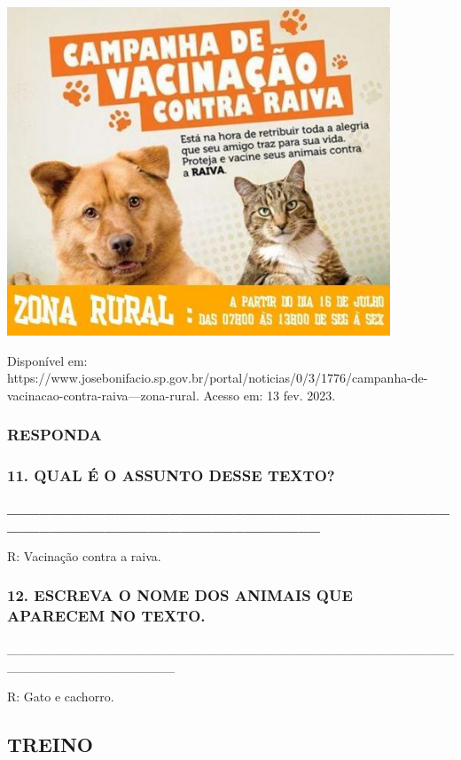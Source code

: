 \includegraphics[width=4.50249in,height=3.85413in]{media/image165.jpg}

Disponível em: https://www.josebonifacio.sp.gov.br/portal/noticias/0/3/1776/campanha-de-vacinacao-contra-raiva---zona-rural.
Acesso em: 13 fev. 2023.

\subsubsection{RESPONDA}\label{responda}

\subsubsection{11. QUAL É O ASSUNTO DESSE
TEXTO?}\label{qual-uxe9-o-assunto-desse-texto-1}

\textbf{\_\_\_\_\_\_\_\_\_\_\_\_\_\_\_\_\_\_\_\_\_\_\_\_\_\_\_\_\_\_\_\_\_\_\_\_\_\_\_\_\_\_\_\_\_\_\_\_\_\_\_\_\_\_\_\_\_\_\_\_\_\_\_\_\_\_\_\_\_\_}

R: Vacinação contra a raiva.

\subsubsection{12. ESCREVA O NOME DOS ANIMAIS QUE APARECEM NO
TEXTO.}\label{escreva-o-nome-dos-animais-que-aparece-no-texto.}

\_\_\_\_\_\_\_\_\_\_\_\_\_\_\_\_\_\_\_\_\_\_\_\_\_\_\_\_\_\_\_\_\_\_\_\_\_\_\_\_\_\_\_\_\_\_\_\_\_\_\_\_\_\_\_\_\_\_\_\_\_\_\_\_\_\_

R: Gato e cachorro.

\subsection{TREINO}\label{treino-4}

